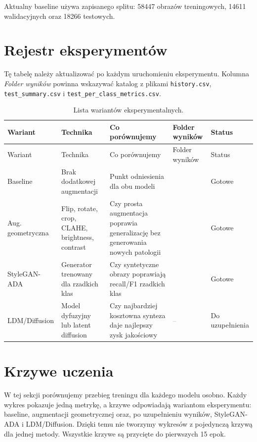 \documentclass[11pt,a4paper]{article}
\newcommand{\missingresult}{\textcolor{gray}{--}}
\begin{document}
Aktualny baseline używa zapisanego splitu: 58447 obrazów treningowych,
14611 walidacyjnych oraz 18266 testowych.

\section{Rejestr eksperymentów}

Tę tabelę należy aktualizować po każdym uruchomieniu eksperymentu. Kolumna \textit{Folder wyników}
powinna wskazywać katalog z plikami \texttt{history.csv}, \texttt{test\_summary.csv}
i \texttt{test\_per\_class\_metrics.csv}.

\small
\setlength{\tabcolsep}{3pt}
\begin{longtable}{L{2.2cm}L{3.0cm}L{5.2cm}L{3.1cm}L{1.6cm}}
\caption{Lista wariantów eksperymentalnych.}
\label{tab:experiment-register}\\
\toprule
Wariant & Technika & Co porównujemy & Folder wyników & Status \\
\midrule
\endfirsthead
\toprule
Wariant & Technika & Co porównujemy & Folder wyników & Status \\
\midrule
\endhead
Baseline & Brak dodatkowej augmentacji & Punkt odniesienia dla obu modeli &  & Gotowe \\
Aug. geometryczna & Flip, rotate, crop, CLAHE, brightness, contrast & Czy prosta augmentacja poprawia generalizację bez generowania nowych patologii &  & Gotowe \\
StyleGAN-ADA & Generator trenowany dla rzadkich klas & Czy syntetyczne obrazy poprawiają recall/F1 rzadkich klas &  & Gotowe \\
LDM/Diffusion & Model dyfuzyjny lub latent diffusion & Czy najbardziej kosztowna synteza daje najlepszy zysk jakościowy & \missingresult & Do uzupełnienia \\
\bottomrule
\end{longtable}
\normalsize
\setlength{\tabcolsep}{6pt}

\section{Krzywe uczenia}

W tej sekcji porównujemy przebieg treningu dla każdego modelu osobno. Każdy wykres pokazuje jedną
metrykę, a krzywe odpowiadają wariantom eksperymentu: baseline, augmentacji geometrycznej oraz,
po uzupełnieniu wyników, StyleGAN-ADA i LDM/Diffusion. Dzięki temu nie tworzymy wykresów z pojedynczą
krzywą dla jednej metody. Wszystkie krzywe są przycięte do pierwszych 15 epok.
\end{document}
